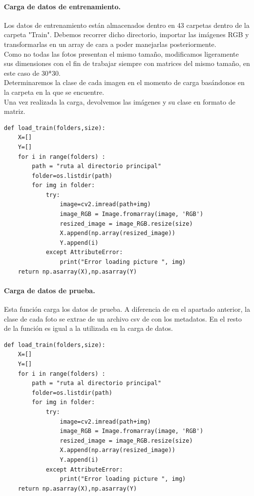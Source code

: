 \documentclass[a4paper,11pt]{article}
\begin{document}
\paragraph{Carga de datos de entrenamiento.}
Los datos de entrenamiento están almacenados dentro en 43 carpetas dentro de la carpeta "Train". Debemos recorrer dicho directorio, importar las imágenes RGB y transformarlas en un array de cara a poder manejarlas posteriormente.\\

\noindent
Como no todas las fotos presentan el mismo tamaño, modificamos ligeramente sus dimensiones con el fin de trabajar siempre con matrices del mismo tamaño, en este caso de 30*30.\\

\noindent
Determinaremos la clase de cada imagen en el momento de carga basándonos en la carpeta en la que se encuentre. \\

\noindent
Una vez realizada la carga, devolvemos las imágenes y su clase en formato de matriz.
\begin{lstlisting}
def load_train(folders,size):
    X=[]
    Y=[]
    for i in range(folders) :
        path = "ruta al directorio principal"
        folder=os.listdir(path)
        for img in folder:
            try:
                image=cv2.imread(path+img)
                image_RGB = Image.fromarray(image, 'RGB')
                resized_image = image_RGB.resize(size)
                X.append(np.array(resized_image))
                Y.append(i)
            except AttributeError:
                print("Error loading picture ", img)
    return np.asarray(X),np.asarray(Y)
\end{lstlisting}

\paragraph{Carga de datos de prueba.}
Esta función carga los datos de prueba. A diferencia de en el apartado anterior, la clase de cada foto se extrae de un archivo csv de con los metadatos. En el resto de la función es igual a la utilizada en la carga de datos.

\begin{lstlisting}
def load_train(folders,size):
    X=[]
    Y=[]
    for i in range(folders) :
        path = "ruta al directorio principal"
        folder=os.listdir(path)
        for img in folder:
            try:
                image=cv2.imread(path+img)
                image_RGB = Image.fromarray(image, 'RGB')
                resized_image = image_RGB.resize(size)
                X.append(np.array(resized_image))
                Y.append(i)
            except AttributeError:
                print("Error loading picture ", img)
    return np.asarray(X),np.asarray(Y)
\end{lstlisting}
\end{document}
